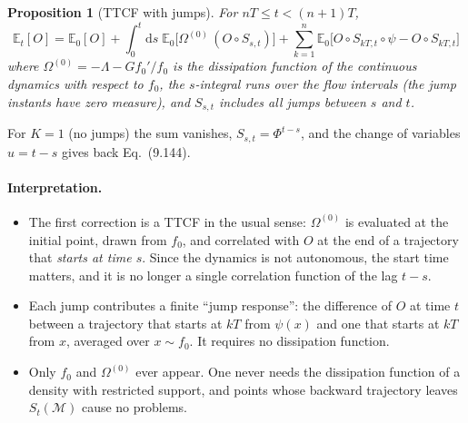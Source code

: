 \documentclass[11pt,a4paper]{article}
\newtheorem{proposition}{Proposition}
\theoremstyle{remark}
\newcommand{\E}{\mathbb{E}}
\newcommand{\M}{\mathcal{M}}
\newcommand{\dd}{\mathrm{d}}
\begin{document}
\begin{proposition}[TTCF with jumps]
For $nT\le t<(n+1)T$,
\begin{equation}\label{eq:ttcf}
\boxed{\;
  \E_t[O] = \E_0[O]
  + \int_0^t \dd s\;\E_0\big[\Omega^{(0)}\,(O\circ S_{s,t})\big]
  + \sum_{k=1}^{n} \E_0\big[O\circ S_{kT,t}\circ\psi - O\circ S_{kT,t}\big]
\;}
\end{equation}
where $\Omega^{(0)}=-\Lambda-Gf_0'/f_0$ is the dissipation function of the
\emph{continuous} dynamics with respect to $f_0$, the $s$-integral runs over
the flow intervals (the jump instants have zero measure), and $S_{s,t}$
includes all jumps between $s$ and $t$.
\end{proposition}

For $K=1$ (no jumps) the sum vanishes, $S_{s,t}=\Phi^{t-s}$, and the change of
variables $u=t-s$ gives back Eq.~(9.144).

\paragraph{Interpretation.}
\begin{itemize}
\item The first correction is a TTCF in the usual sense: $\Omega^{(0)}$ is
  evaluated at the initial point, drawn from $f_0$, and correlated with $O$
  at the end of a trajectory that \emph{starts at time $s$}. Since the
  dynamics is not autonomous, the start time matters, and it is no longer a
  single correlation function of the lag $t-s$.
\item Each jump contributes a finite ``jump response'': the difference of
  $O$ at time $t$ between a trajectory that starts at $kT$ from $\psi(x)$ and
  one that starts at $kT$ from $x$, averaged over $x\sim f_0$. It requires no
  dissipation function.
\item Only $f_0$ and $\Omega^{(0)}$ ever appear. One never needs the
  dissipation function of a density with restricted support, and points
  whose backward trajectory leaves $S_t(\M)$ cause no problems.
\end{itemize}
\end{document}
